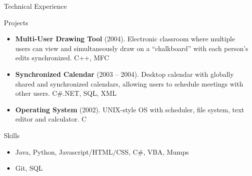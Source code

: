 
	\begin{cvsection}{Technical Experience}
		\begin{cvsubsection}{Projects}{}{}
			\begin{itemize}
				\item \textbf{Multi-User Drawing Tool} (2004). Electronic classroom where multiple users can view and simultaneously draw on a “chalkboard” with each person’s edits synchronized.  C++, MFC
				\item \textbf{Synchronized Calendar} (2003 – 2004). Desktop calendar with globally shared and synchronized calendars, allowing users to schedule meetings with other users.  C\#.NET, SQL, XML
				\item \textbf{Operating System} (2002).  UNIX-style OS with scheduler, file system, text editor and calculator. C
			\end{itemize}
		\end{cvsubsection}
	\end{cvsection}
	
	

\begin{cvsection}{Skills}
	\begin{cvsubsection}{}{}{}	
		\begin{itemize}
			\item Java, Python, Javascript$/$HTML$/$CSS, C\#, VBA, Mumps
			\item  Git, SQL
		\end{itemize}
	\end{cvsubsection}
\end{cvsection}